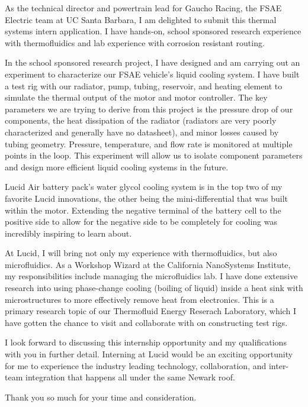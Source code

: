 \documentclass[11pt, letterpaper]{awesome-cv} %
\begin{document}
\makecvheader %

\makelettertitle %


\begin{cvletter}

As the technical director and powertrain lead for Gaucho Racing, the FSAE Electric team at UC Santa Barbara, I am delighted to submit this thermal systems intern application. I have hands-on, school sponsored research experience with thermofluidics and lab experience with corrosion resistant routing.

In the school sponsored research project, I have designed and am carrying out an experiment to characterize our FSAE vehicle's liquid cooling system. I have built a test rig with our radiator, pump, tubing, reservoir, and heating element to simulate the thermal output of the motor and motor controller. The key parameters we are trying to derive from this project is the pressure drop of our components, the heat dissipation of the radiator (radiators are very poorly characterized and generally have no datasheet), and minor losses caused by tubing geometry. Pressure, temperature, and flow rate is monitored at multiple points in the loop. This experiment will allow us to isolate component parameters and design more efficient liquid cooling systems in the future.

Lucid Air battery pack's water glycol cooling system is in the top two of my favorite Lucid innovations, the other being the mini-differential that was built within the motor. Extending the negative terminal of the battery cell to the positive side to allow for the negative side to be completely for cooling was incredibly inspiring to learn about.

At Lucid, I will bring not only my experience with thermofluidics, but also microfluidics. As a Workshop Wizard at the California NanoSystems Institute, my responsibilities include managing the microfluidics lab. I have done extensive research into using phase-change cooling (boiling of liquid) inside a heat sink with microstructures to more effectively remove heat from electronics. This is a primary research topic of our Thermofluid Energy Reserach Laboratory, which I have gotten the chance to visit and collaborate with on constructing test rigs.

I look forward to discussing this internship opportunity and my qualifications with you in further detail. Interning at Lucid would be an exciting opportunity for me to experience the industry leading technology, collaboration, and inter-team integration that happens all under the same Newark roof.

Thank you so much for your time and consideration.



\end{cvletter}


\makeletterclosing %
\end{document}
